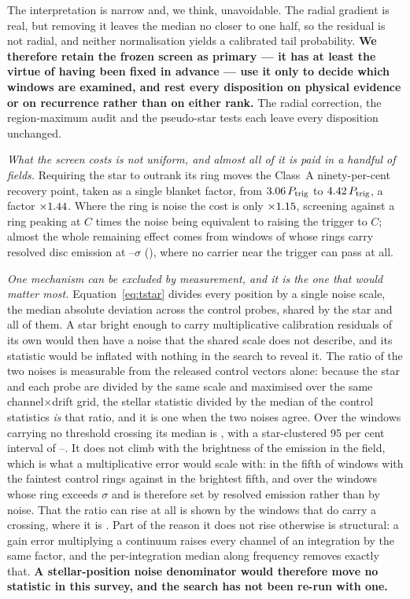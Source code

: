 The interpretation is narrow and, we think, unavoidable. The radial gradient
is real, but removing it leaves the median no closer to one half, so the
residual is not radial, and neither normalisation yields a calibrated tail
probability. \textbf{We therefore retain the frozen screen as primary --- it
has at least the virtue of having been fixed in advance --- use it only to
decide which windows are examined, and rest every disposition on physical
evidence or on recurrence rather than on either rank.} The radial
correction, the region-maximum audit and the pseudo-star tests each leave
every disposition unchanged.

\emph{What the screen costs is not uniform, and almost all of it is paid in
a handful of fields.} Requiring the star to outrank its ring moves the
Class~A ninety-per-cent recovery point, taken as a single blanket factor,
from $3.06\,P_{\rm trig}$ to $4.42\,P_{\rm trig}$, a
factor $\times1.44$. Where the ring
is noise the cost is only $\times1.15$, screening against a ring
peaking at $C$ times the noise being equivalent to raising the trigger to
$C$; almost the whole remaining effect comes from \ScrNBright{} windows of
\ScrNWinA{} whose rings carry resolved disc emission at
\ScrBrightLo--\ScrBrightHi$\sigma$ (\ScrBrightStars), where no carrier near
the trigger can pass at all.

\emph{One mechanism can be excluded by measurement, and it is the one that
would matter most.} Equation~\ref{eq:tstar} divides every position by a
single noise scale, the median absolute deviation across the control probes,
shared by the star and all of them. A star bright enough to carry
multiplicative calibration residuals of its own would then have a noise that
the shared scale does not describe, and its statistic would be inflated with
nothing in the search to reveal it. The ratio of the two noises is
measurable from the released control vectors alone: because the star and
each probe are divided by the same scale and maximised over the same
channel$\times$drift grid, the stellar statistic divided by the median of
the \NCtrl{} control statistics \emph{is} that ratio, and it is one when the
two noises agree. Over the \NsrNWin{} windows carrying no threshold crossing
its median is \NsrMed, with a star-clustered 95 per cent interval of
\NsrLo--\NsrHi. It does not climb with the brightness of the emission in the
field, which is what a multiplicative error would scale with: \NsrFifthLo{}
in the fifth of windows with the faintest control rings against
\NsrFifthHi{} in the brightest fifth, and \NsrBrightMed{} over the
\NsrBrightN{} windows whose ring exceeds \NsrBrightSig$\sigma$ and is
therefore set by resolved emission rather than by noise. That the ratio can
rise at all is shown by the \NsrCrossN{} windows that do carry a crossing,
where it is \NsrCrossMed. Part of the reason it does not rise otherwise is
structural: a gain error multiplying a continuum raises every channel of an
integration by the same factor, and the per-integration median along
frequency removes exactly that. \textbf{A stellar-position noise denominator
would therefore move no statistic in this survey, and the search has not
been re-run with one.}

